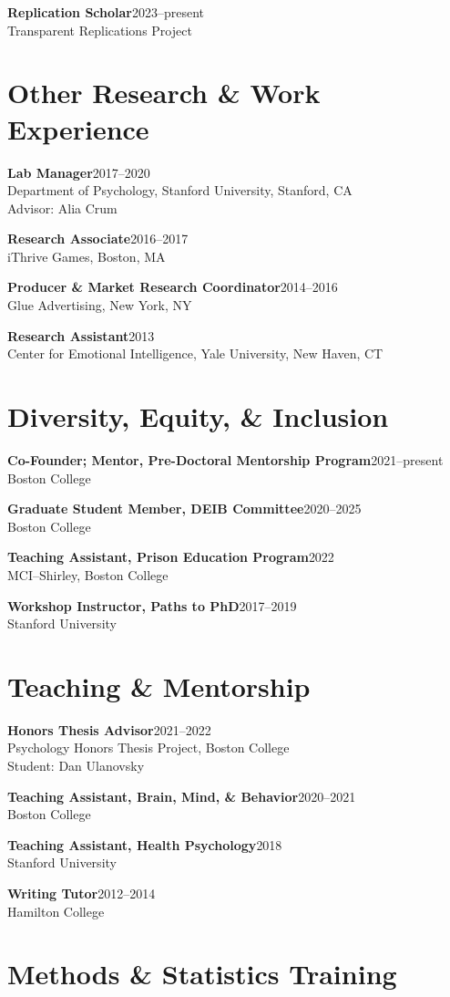 \documentclass[11pt, letterpaper]{article}
\newcommand{\cventry}[3]{%
    \textbf{#1}\hfill #2\\
    {\color{mutedgray}#3}\par\vspace{0.3em}%
}
\newcommand{\cventrynote}[4]{%
    \textbf{#1}\hfill #2\\
    {\color{mutedgray}#3}\\
    {\small\color{mutedgray}#4}\par\vspace{0.3em}%
}
\begin{document}
\cventry{Replication Scholar}{2023--present}
    {Transparent Replications Project}

\section{Other Research \& Work Experience}

\cventrynote{Lab Manager}{2017--2020}
    {Department of Psychology, Stanford University, Stanford, CA}
    {Advisor: Alia Crum}

\cventry{Research Associate}{2016--2017}
    {iThrive Games, Boston, MA}

\cventry{Producer \& Market Research Coordinator}{2014--2016}
    {Glue Advertising, New York, NY}

\cventry{Research Assistant}{2013}
    {Center for Emotional Intelligence, Yale University, New Haven, CT}

\section{Diversity, Equity, \& Inclusion}

\cventry{Co-Founder; Mentor, Pre-Doctoral Mentorship Program}{2021--present}
    {Boston College}

\cventry{Graduate Student Member, DEIB Committee}{2020--2025}
    {Boston College}

\cventry{Teaching Assistant, Prison Education Program}{2022}
    {MCI--Shirley, Boston College}

\cventry{Workshop Instructor, Paths to PhD}{2017--2019}
    {Stanford University}

\section{Teaching \& Mentorship}

\cventrynote{Honors Thesis Advisor}{2021--2022}
    {Psychology Honors Thesis Project, Boston College}
    {Student: Dan Ulanovsky}

\cventry{Teaching Assistant, Brain, Mind, \& Behavior}{2020--2021}
    {Boston College}

\cventry{Teaching Assistant, Health Psychology}{2018}
    {Stanford University}

\cventry{Writing Tutor}{2012--2014}
    {Hamilton College}

\section{Methods \& Statistics Training}
\end{document}

